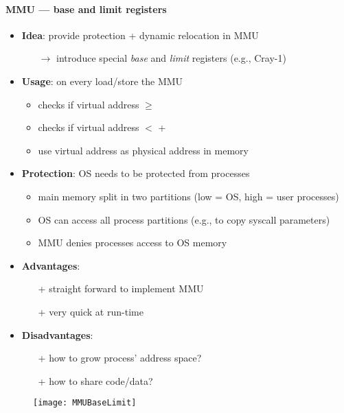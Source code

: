 \paragraph{MMU --- base and limit registers}
\begin{itemize}
  \item \textbf{Idea}: provide protection + dynamic relocation in MMU
  \begin{itemize}
    \item[$ \to $] introduce special \emph{base} and \emph{limit} registers (e.g., Cray-1)
  \end{itemize}
  \item \textbf{Usage}: on every load/store the MMU 
  \begin{itemize}
    \item checks if virtual address \( \geq \) 
    \item checks if virtual address \( < \)  + 
    \item use virtual address as physical address in memory
  \end{itemize}
  \item \textbf{Protection}: OS needs to be protected from processes
  \begin{itemize}
    \item main memory split in two partitions (low = OS, high = user processes)
    \item OS can access all process partitions (e.g., to copy syscall parameters)
    \item MMU denies processes access to OS memory
  \end{itemize}
  \item \textbf{Advantages}:
  \begin{itemize}
    \item[+] straight forward to implement MMU
    \item[+] very quick at run-time
  \end{itemize}
  \item \textbf{Disadvantages}:
  \begin{itemize}
    \item[+] how to grow process' address space?
    \item[+] how to share code/data?
  \end{itemize}
\end{itemize}
\begin{figure}[h]\centering\label{MMUBaseLimit}\texttt{[image: MMUBaseLimit]}\end{figure}

